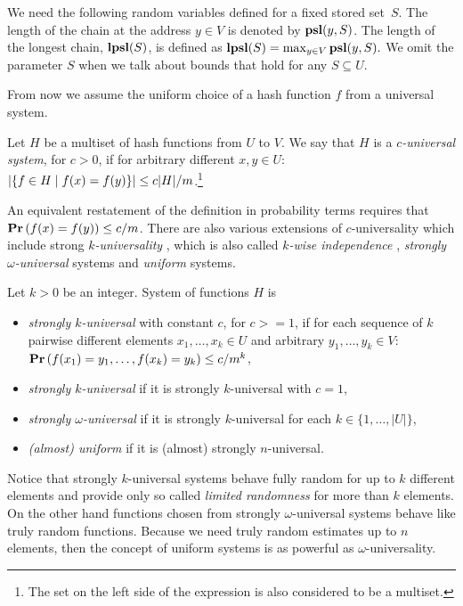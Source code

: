 We need the following random variables defined for a fixed stored set~$S$.
The length of the chain at the address $y \in V$ is denoted by $\mathbf{psl}(y, S)$. 
The length of the longest chain, $\mathbf{lpsl}(S)$, is defined as $\mathbf{lpsl}(S) = \max_{y \in V} \mathbf{psl}(y, S).$
We omit the parameter $S$ when we talk about bounds that hold for any $S \subseteq U$.

From now we assume the uniform choice of a hash function $f$ from a universal system.

\begin{definition}
\label{definition-c-universal-system}
Let $H$ be a multiset of hash functions from $U$ to $V$. We say that $H$ is a \emph{$c$-universal system}, for $c > 0$, if for arbitrary different $x, y \in U$: $\left|\lbrace f \in H \mid f(x) = f(y) \rbrace\right| \leq {c|H|}/{m}$.\footnote{The set on the left side of the expression is also considered to be a multiset.}
\end{definition}

An equivalent restatement of the definition in probability terms requires that $\mathbf{Pr}\left(f(x) = f(y)\right) \leq c/m$. There are also various extensions of $c$-universality which include strong \emph{$k$-universality} \cite{DBLP:conf/focs/WegmanC79}, which is also called \emph{$k$-wise independence} \cite{DBLP:conf/focs/WegmanC79}, \emph{strongly $\omega$-universal} \cite{DBLP:conf/focs/WegmanC79} systems and \emph{uniform} \cite{DBLP:journals/siamcomp/PaghP08} systems.
\begin{definition}
Let $k > 0$ be an integer. System of functions $H$ is
\begin{itemize}
	\item \emph{strongly $k$-universal} with constant $c$, for $c >= 1$, if for each sequence of $k$ pairwise different elements $x_1, \dots, x_k \in U$ and arbitrary $y_1, \dots, y_k \in V$: $\mathbf{Pr}\left(f(x_1) = y_1, \dots, f(x_k) = y_k\right) \leq {c}/{m^k}$,
	\item \emph{strongly $k$-universal} if it is strongly $k$-universal with $c = 1$,
	\item \emph{strongly $\omega$-universal} if it is strongly $k$-universal for each $k \in \{1, \dots, |U|\}$,
	\item \emph{(almost) uniform} if it is (almost) strongly $n$-universal.
\end{itemize}
\end{definition}

Notice that strongly $k$-universal systems behave fully random for up to $k$ different elements and provide only so called \emph{limited randomness} for more than $k$ elements. On the other hand functions chosen from strongly $\omega$-universal systems behave like truly random functions. Because we need truly random estimates up to $n$ elements, then the concept of uniform systems is as powerful as $\omega$-universality.

